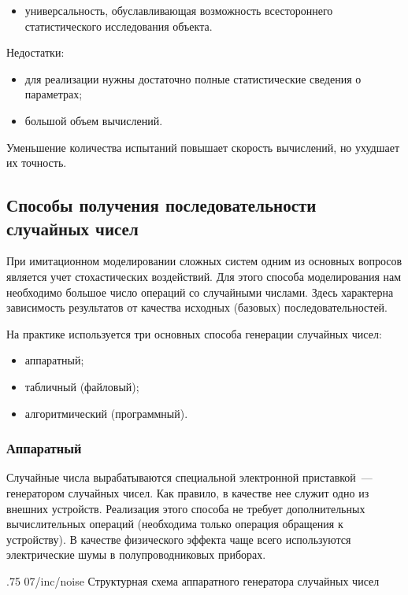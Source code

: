 \begin{itemize}
    \item универсальность, обуславливающая возможность всестороннего статистического исследования объекта.
\end{itemize}

Недостатки:

\begin{itemize}
    \item для реализации нужны достаточно полные статистические сведения о параметрах;
    \item большой объем вычислений.
\end{itemize}

Уменьшение количества испытаний повышает скорость вычислений, но ухудшает их точность.

\subsection{Способы получения последовательности случайных чисел}

При имитационном моделировании сложных систем одним из основных вопросов является учет стохастических воздействий. Для этого способа моделирования нам необходимо большое число операций со случайными числами. Здесь характерна зависимость результатов от качества исходных (базовых) последовательностей.

На практике используется три основных способа генерации случайных чисел:

\begin{itemize}
    \item аппаратный;
    \item табличный (файловый);
    \item алгоритмический (программный).
\end{itemize}

\subsubsection{Аппаратный}

Случайные числа вырабатываются специальной электронной приставкой~--- генератором случайных чисел. Как правило, в качестве нее служит одно из внешних устройств. Реализация этого способа не требует дополнительных вычислительных операций (необходима только операция обращения к устройству). В качестве физического эффекта чаще всего используются электрические шумы в полупроводниковых приборах.

\image
{.75\textwidth}
{07/inc/noise}
{Структурная схема аппаратного генератора случайных чисел}

